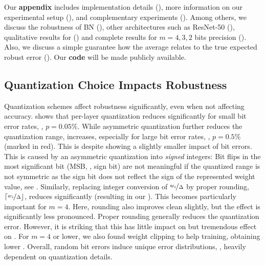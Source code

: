 Our \textbf{appendix} includes implementation details (), more information on our experimental setup (), and complementary experiments (). Among others, we discuss the robustness of BN (), other architectures such as ResNet-50 (), qualitative results for \Clipping () and complete results for $m = 4,3,2$ bits precision (). Also, we discuss a simple guarantee how the average \RTE relates
to the true expected robust error (). Our \textbf{code} will be made publicly available.

\subsection{Quantization Choice Impacts Robustness}
\label{subsec:experiments-quantization}

Quantization schemes affect robustness significantly, even when not affecting accuracy. 
 shows that per-layer quantization reduces \RTE significantly for small bit error rates, \eg, $p = 0.05\%$. While asymmetric quantization further reduces the quantization range, \RTE increases, especially for large bit error rates, \eg, $p = 0.5\%$ (marked in {\color{colorbrewer1}red}). This is despite  showing a slightly smaller impact of bit errors. This is caused by an asymmetric quantization into \emph{signed} integers: Bit flips in the most significant bit (MSB, \ie, sign bit) are not meaningful if the quantized range is not symmetric as the sign bit does not reflect the sign of the represented weight value, see . Similarly, replacing integer conversion of $\nicefrac{w_i}{\Delta}$ by proper rounding, $\lceil\nicefrac{w_i}{\Delta}\rfloor$, reduces \RTE significantly (resulting in our \Quant).
This becomes particularly important for $m = 4$. Here, rounding also improves clean \TE slightly, but the effect is significantly less pronounced. Proper rounding generally reduces the quantization error. However, it is striking that this has little impact on \TE but tremendous effect on \RTE.
For $m = 4$ or lower, we also found weight clipping to help training, obtaining lower \TE.
Overall, random bit errors induce unique error distributions, \cf {}, heavily dependent on quantization details.

